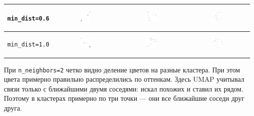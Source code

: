 \begin{center}
\begin{tabular}{c|c|c|c}
	\hline
	\begin{sideways} \verb|min_dist=0.6| \end{sideways} & \includegraphics*[width = 0.18\textwidth]{0,6colors2.png} & \includegraphics*[width = 0.18\textwidth]{0,6colors3.png} & \includegraphics*[width = 0.18\textwidth]{0,6colors8.png} \\
	\hline
	\begin{sideways} \verb|min_dist=1.0| \end{sideways} & \includegraphics*[width = 0.18\textwidth]{1,0colors2.png} & \includegraphics*[width = 0.18\textwidth]{1,0colors3.png} & \includegraphics*[width = 0.18\textwidth]{1,0colors8.png} \\
\end{tabular}
\end{center}

При \verb|n_neighbors=2| четко видно деление цветов на разные кластера. При этом цвета примерно правильно распределились по оттенкам. Здесь UMAP учитывал связи только с ближайшими двумя соседями: искал похожих и ставил их рядом. Поэтому в кластерах примерно по три точки --- они все ближайшие соседи друг друга.

